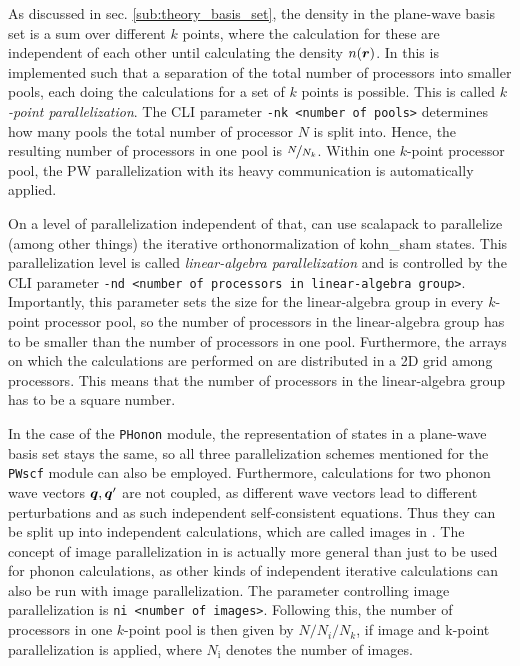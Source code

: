 \documentclass[main.tex]{subfiles}
\begin{document}
As discussed in sec. \ref{sub:theory_basis_set}, the density in the plane-wave basis set is a sum over different \(k\) points, where the calculation for these are independent of each other until calculating the density \(n( \vb*{r})\).
In \QE this is implemented such that a separation of the total number of processors into smaller pools, each doing the calculations for a set of \(k\) points is possible.
This is called \emph{\(k\)-point parallelization}.
The CLI parameter \texttt{-nk <number of pools>} determines how many pools the total number of processor \(N\) is split into.
Hence, the resulting number of processors in one pool is \(\nicefrac{N}{N_k}\).
Within one \(k\)-point processor pool, the PW parallelization with its heavy communication is automatically applied.

On a level of parallelization independent of that, \QE can use \gls{scalapack} to parallelize (among other things) the iterative orthonormalization of \acrshort{kohn_sham} states.
This parallelization level is called \emph{linear-algebra parallelization} and is controlled by the CLI parameter \texttt{-nd <number of processors in linear-algebra group>}.
Importantly, this parameter sets the size for the linear-algebra group in every \(k\)-point processor pool, so the number of processors in the linear-algebra group has to be smaller than the number of processors in one pool.
Furthermore, the arrays on which the calculations are performed on are distributed in a 2D grid among processors.
This means that the number of processors in the linear-algebra group has to be a square number.

In the case of the \texttt{PHonon} module, the representation of states in a plane-wave basis set stays the same, so all three parallelization schemes mentioned for the \texttt{PWscf} module can also be employed.
Furthermore, calculations for two phonon wave vectors \(\vb*{q}, \vb*{q}^{\prime}\) are not coupled, as different wave vectors lead to different perturbations and as such independent self-consistent equations.
Thus they can be split up into independent calculations, which are called images in \QE.
The concept of image parallelization in \QE is actually more general than just to be used for phonon calculations, as other kinds of independent iterative calculations can also be run with image parallelization.
The parameter controlling image parallelization is \texttt{ni <number of images>}.
Following this, the number of processors in one \(k\)-point pool is then given by \(N / N_i / N_k\), if image and k-point parallelization is applied, where \(N_\mathrm{i}\) denotes the number of images.
\end{document}

